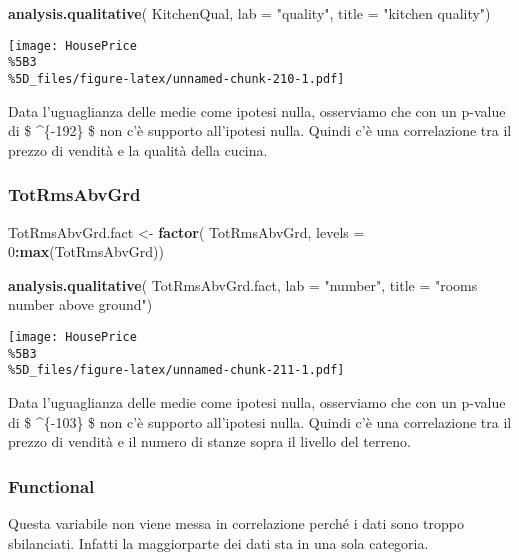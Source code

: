 \documentclass[
]{article}
\newenvironment{Shaded}{\begin{snugshade}}{\end{snugshade}}
\newcommand{\AttributeTok}[1]{\textcolor[rgb]{0.13,0.29,0.53}{#1}}
\newcommand{\DecValTok}[1]{\textcolor[rgb]{0.00,0.00,0.81}{#1}}
\newcommand{\FunctionTok}[1]{\textcolor[rgb]{0.13,0.29,0.53}{\textbf{#1}}}
\newcommand{\NormalTok}[1]{#1}
\newcommand{\OtherTok}[1]{\textcolor[rgb]{0.56,0.35,0.01}{#1}}
\newcommand{\SpecialCharTok}[1]{\textcolor[rgb]{0.81,0.36,0.00}{\textbf{#1}}}
\newcommand{\StringTok}[1]{\textcolor[rgb]{0.31,0.60,0.02}{#1}}
\begin{document}
\begin{Shaded}
\begin{Highlighting}[]
\FunctionTok{analysis.qualitative}\NormalTok{(}
\NormalTok{    KitchenQual,}
    \AttributeTok{lab =} \StringTok{"quality"}\NormalTok{,}
    \AttributeTok{title =} \StringTok{"kitchen quality"}\NormalTok{)}
\end{Highlighting}
\end{Shaded}

\texttt{[image: HousePrice\\\%5B3\\\%5D\_files/figure-latex/unnamed-chunk-210-1.pdf]}

Data l'uguaglianza delle medie come ipotesi nulla, osserviamo che con un
p-value di \$ \^{}\{-192\} \$ non c'è supporto all'ipotesi
nulla. Quindi c'è una correlazione tra il prezzo di vendità e la qualità
della cucina.

\subsubsection{TotRmsAbvGrd}\label{totrmsabvgrd-1}

\begin{Shaded}
\begin{Highlighting}[]
\NormalTok{TotRmsAbvGrd.fact }\OtherTok{\textless{}{-}} \FunctionTok{factor}\NormalTok{(}
\NormalTok{    TotRmsAbvGrd,}
    \AttributeTok{levels =} \DecValTok{0}\SpecialCharTok{:}\FunctionTok{max}\NormalTok{(TotRmsAbvGrd))}

\FunctionTok{analysis.qualitative}\NormalTok{(}
\NormalTok{    TotRmsAbvGrd.fact,}
    \AttributeTok{lab =} \StringTok{"number"}\NormalTok{,}
    \AttributeTok{title =} \StringTok{"rooms number above ground"}\NormalTok{)}
\end{Highlighting}
\end{Shaded}

\texttt{[image: HousePrice\\\%5B3\\\%5D\_files/figure-latex/unnamed-chunk-211-1.pdf]}

Data l'uguaglianza delle medie come ipotesi nulla, osserviamo che con un
p-value di \$ \^{}\{-103\} \$ non c'è supporto all'ipotesi
nulla. Quindi c'è una correlazione tra il prezzo di vendità e il numero
di stanze sopra il livello del terreno.

\subsubsection{Functional}\label{functional-1}

Questa variabile non viene messa in correlazione perché i dati sono
troppo sbilanciati. Infatti la maggiorparte dei dati sta in una sola
categoria.
\end{document}
